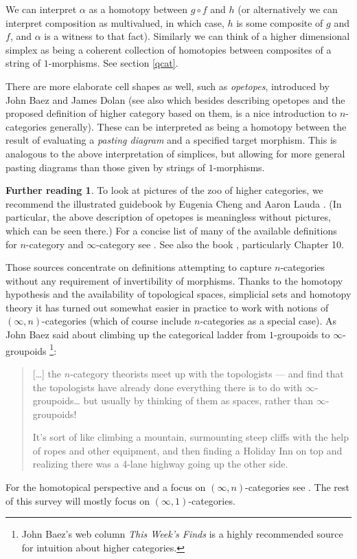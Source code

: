 \documentclass[12pt]{amsart}
\theoremstyle{definition} \newtheorem{definition}[theorem]{Definition}
\newtheorem*{further}{Further reading}
\numberwithin{equation}{section}
\newcommand{\oo}{\infty}
\newcommand{\io}{$(\oo,1)$}
\begin{document}
We can interpret $\alpha$ as a homotopy between $g\circ f$ and $h$ (or
alternatively we can interpret composition as multivalued, in which
case, $h$ is some composite of $g$ and $f$, and $\alpha$ is a witness
to that fact). Similarly we can think of a higher dimensional simplex
as being a coherent collection of homotopies between composites
of a string of $1$-morphisms. See section \ref{qcat}.

There are more elaborate cell shapes as well, such as \emph{opetopes},
introduced by John Baez and James Dolan \cite{BaezDolan3} (see also
\cite{BaezIntro} which besides describing opetopes and the proposed
definition of higher category based on them, is a nice introduction to
$n$-categories generally). These can be interpreted as being a
homotopy between the result of evaluating a \emph{pasting diagram} and
a specified target morphism. This is analogous to the above
interpretation of simplices, but allowing for more general pasting
diagrams than those given by strings of $1$-morphisms.

\begin{further}
  To look at pictures of the zoo of higher categories, we recommend
  the illustrated guidebook by Eugenia Cheng and Aaron Lauda
  \cite{ChengLauda}. (In particular, the above description of opetopes
  is meaningless without pictures, which can be seen there.)  For a
  concise list of many of the available definitions for $n$-category
  and $\oo$-category see \cite{LeinsterDef}. See also the book
  \cite{LeinsterBook}, particularly Chapter 10.

  Those sources concentrate on definitions attempting to capture
  $n$-categories without any requirement of invertibility of morphisms.
  Thanks to the homotopy hypothesis and the availability of topological
  spaces, simplicial sets and homotopy theory it has turned out somewhat
  easier in practice to work with notions of $(\oo,n)$-categories
  (which of course include $n$-categories as a special case). As John
  Baez said about climbing up the categorical ladder from $1$-groupoids
  to $\oo$-groupoids \cite{TWF223}\footnote{John Baez's web column
  \emph{This Week's Finds} is a highly recommended source for intuition
  about higher categories.}:

  \begin{quotation}
    [\dots] the $n$-category theorists meet up with the topologists ---
    and find that the topologists have already done everything there is
    to do with $\oo$-groupoids\dots{} but usually by thinking of them
    as spaces, rather than $\oo$-groupoids!

    It's sort of like climbing a mountain, surmounting steep cliffs with
    the help of ropes and other equipment, and then finding a Holiday
    Inn on top and realizing there was a 4-lane highway going up the
    other side.
  \end{quotation}

  For the homotopical perspective and a focus on $(\oo,n)$-categories
  see \cite{Simpson}. The rest of this survey will mostly focus on
  \io-categories.
\end{further}
\end{document}
